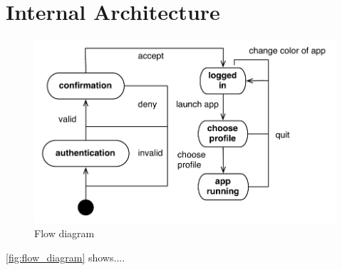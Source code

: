 \section{Internal Architecture}



\begin{figure}[h]
	\centering
	\includegraphics[width=1\textwidth]{gfx/flow-diagram.pdf}
	\caption{Flow diagram}
	\label{fig:flow_diagram}
\end{figure}

\autoref{fig:flow_diagram} shows.... 